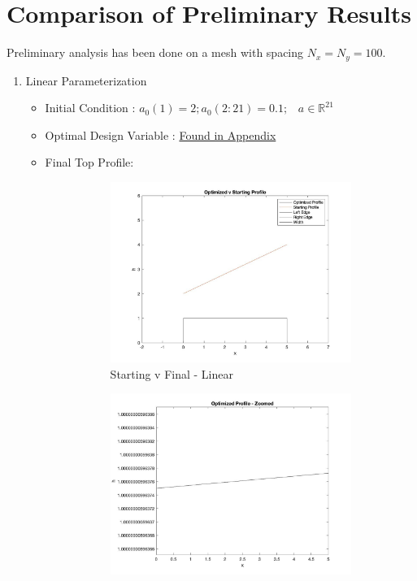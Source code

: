 \documentclass{article}
\begin{document}
\section{Comparison of Preliminary Results}
Preliminary analysis has been done on a mesh with spacing $N_x = N_y = 100$.  
\begin{enumerate}
	\item Linear Parameterization
		\begin{itemize}
			\item Initial Condition : $a_0(1) = 2; a_0(2:21) = 0.1; \; \; \; a\in \mathbb{R}^{21}$
			\item Optimal Design Variable : \hyperlink{X_linear}{Found in Appendix}
			\item Final Top Profile: 
			\begin{figure}[H]
				\centering
				\begin{subfigure}[b]{0.45\textwidth}
         			\centering
         			\includegraphics[width=\textwidth]{Mtd2_SP1_1}
         			\caption{Starting v Final - Linear}
         			\label{fig: linear start v end}
         		\end{subfigure}
         		\hfill
			\begin{subfigure}[b]{0.45\textwidth}
         			\centering
         			\includegraphics[width=\textwidth]{Mtd2_SP1_2}

\end{subfigure}
\end{figure}
\end{itemize}
\end{enumerate}
\end{document}

